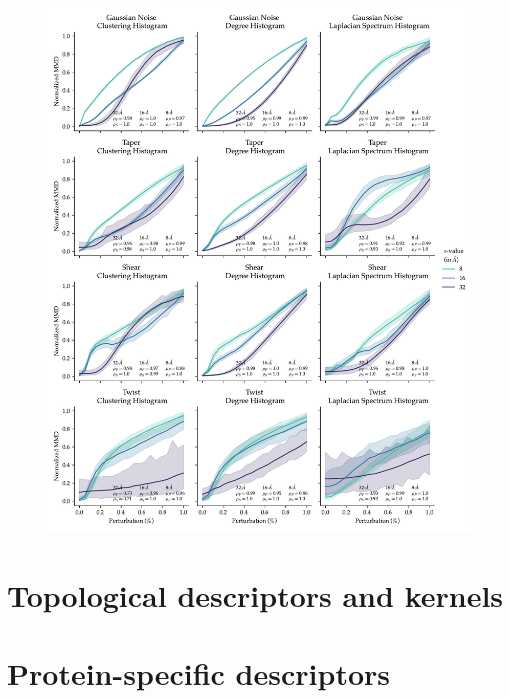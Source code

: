 \begin{figure}
  \includegraphics[width=\textwidth]{./figures/results/res_2.pdf}
\end{figure}

\section{Topological descriptors and kernels}

\section{Protein-specific descriptors}




